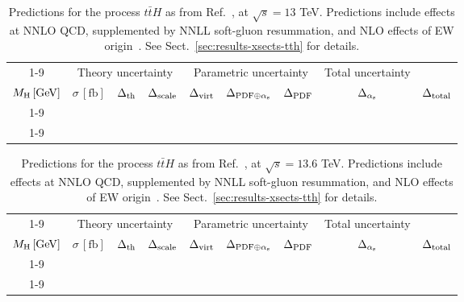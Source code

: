 \begin{table}[ht!]
\caption{\label{tab:tth-tot13} Predictions for the process $t\bar tH$ as from Ref.~\cite{Balsach:2025jcw}, at $\sqrt{s} = 13$ TeV. Predictions include effects at
NNLO QCD, supplemented by NNLL soft-gluon resummation, and NLO effects of EW origin~\cite{Frixione:2014qaa,Frixione:2015zaa,Kulesza:2015vda,Broggio:2015lya,Broggio:2016lfj,
Kulesza:2017ukk,Frederix:2018nkq,Kulesza:2018tqz,Broggio:2019ewu,Kulesza:2020nfh,
Catani:2022mfv,Devoto:2024nhl}. See Sect.~\ref{sec:results-xsects-tth} for details.}
\centering
\scriptsize
{\renewcommand{\arraystretch}{1.4}
\begin{tabular}{| cc | ccc | ccc | c |}
\cline{1-9}
\multicolumn{2}{|c|}{\(\sqrt{s} = 13\,\mathrm{TeV}\)} &
\multicolumn{3}{|c|}{Theory uncertainty} &
\multicolumn{3}{|c|}{Parametric uncertainty} &
\multicolumn{1}{c|}{Total uncertainty} \\
\(M_\mathrm{H}\,[\mathrm{GeV}]\) & \(\sigma\,[\mathrm{fb}]\) &
\(\Delta_{\rm th}\) &
{\color{black!55}\(\Delta_{\rm scale}\)} & {\color{black!55}\(\Delta_{\rm virt}\)} &
\(\Delta_{{\rm PDF}\oplus\alpha_{\mathrm{s}}}\) &
{\color{black!55}\(\Delta_{\rm PDF}\)} & {\color{black!55}\(\Delta_{\alpha_{\mathrm{s}}}\)} &
\(\Delta_{\rm total}\)
\\
\cline{1-9}
 \\
\cline{1-9}
\end{tabular}
}
\end{table}

\begin{table}[ht!]
\caption{\label{tab:tth-tot136} Predictions for the process $t\bar tH$ as from Ref.~\cite{Balsach:2025jcw}, at $\sqrt{s} = 13.6$ TeV. Predictions include effects at
NNLO QCD, supplemented by NNLL soft-gluon resummation, and NLO effects of EW origin~\cite{Frixione:2014qaa,Frixione:2015zaa,Kulesza:2015vda,Broggio:2015lya,Broggio:2016lfj,
Kulesza:2017ukk,Frederix:2018nkq,Kulesza:2018tqz,Broggio:2019ewu,Kulesza:2020nfh,
Catani:2022mfv,Devoto:2024nhl}. See Sect.~\ref{sec:results-xsects-tth} for details.}
\centering
\scriptsize
{\renewcommand{\arraystretch}{1.4}
\begin{tabular}{| cc | ccc | ccc | c |}
\cline{1-9}
\multicolumn{2}{|c|}{\(\sqrt{s} = 13.6\,\mathrm{TeV}\)} &
\multicolumn{3}{|c|}{Theory uncertainty} &
\multicolumn{3}{|c|}{Parametric uncertainty} &
\multicolumn{1}{c|}{Total uncertainty} \\
\(M_\mathrm{H}\,[\mathrm{GeV}]\) & \(\sigma\,[\mathrm{fb}]\) &
\(\Delta_{\rm th}\) &
{\color{black!55}\(\Delta_{\rm scale}\)} & {\color{black!55}\(\Delta_{\rm virt}\)} &
\(\Delta_{{\rm PDF}\oplus\alpha_{\mathrm{s}}}\) &
{\color{black!55}\(\Delta_{\rm PDF}\)} & {\color{black!55}\(\Delta_{\alpha_{\mathrm{s}}}\)} &
\(\Delta_{\rm total}\)
\\
\cline{1-9}
 \\
\cline{1-9}
\end{tabular}
}
\end{table}

